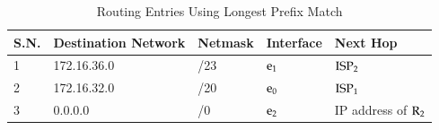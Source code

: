 \begin{table}[H]
\caption{Routing Entries Using Longest Prefix Match}\label{chap2-table-8}
\begin{center}
\begin{tabular}{|l|l|l|l|l|}
\hline
\textbf{S.N.} & \textbf{Destination Network} & \textbf{Netmask} & \textbf{Interface} & \textbf{Next Hop}\\
\hline
1 & 172.16.36.0 & /23 & ${\rm e}_{1}$ & ${\rm ISP}_{2}$\\
\hline
2 & 172.16.32.0 & /20 & ${\rm e}_{0}$ & ${\rm ISP}_{1}$\\
\hline
3 & 0.0.0.0 & /0 & ${\rm e}_{2}$ & IP address of ${\rm R}_{2}$\\
\hline
\end{tabular}
\end{center}
\end{table}

\vspace{-1cm}

